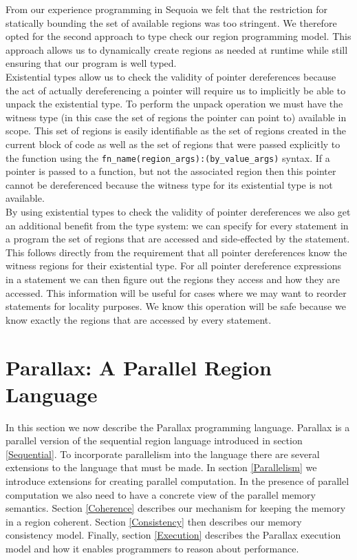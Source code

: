 \documentclass{article}
\theoremstyle{definition}
\begin{document}
\noindent
From our experience programming in Sequoia we felt that the restriction for statically
bounding the set of available regions was too stringent.  We therefore opted for the
second approach to type check our region programming model.  This approach
allows us to dynamically create regions as needed at runtime while still ensuring
that our program is well typed. \\

\noindent
Existential types allow us to check the validity of pointer dereferences because
the act of actually dereferencing a pointer will require us to implicitly be able
to unpack the existential type.  To perform the unpack operation we must have
the witness type (in this case the set of regions the pointer can point to) available
in scope.  This set of regions is easily identifiable as the set of regions created
in the current block of code as well as the set of regions that were passed explicitly
to the function using the {\tt fn\_name(region\_args):(by\_value\_args)} syntax.  If
a pointer is passed to a function, but not the associated region then this pointer
cannot be dereferenced because the witness type for its existential type is not
available.  \\

\noindent
By using existential types to check the validity of pointer dereferences we also get
an additional benefit from the type system: we can specify for every statement in a
program the set of regions that are accessed and side-effected by the statement.  This
follows directly from the requirement that all pointer dereferences know the witness
regions for their existential type.  For all pointer dereference expressions in a
statement we can then figure out the regions they access and how they are accessed.
This information will be useful for cases where we may want to reorder statements for
locality purposes.  We know this operation will be safe because we know exactly the
regions that are accessed by every statement.

\pagebreak


\section{Parallax: A Parallel Region Language \label{Parallax}}
\noindent
In this section we now describe the Parallax programming language.
Parallax is a parallel version of the sequential region language introduced
in section \ref{Sequential}.  To incorporate parallelism into the language
there are several extensions to the language that must be made.  In section
\ref{Parallelism} we introduce extensions for creating parallel computation.  In
the presence of parallel computation we also need to have a concrete view
of the parallel memory semantics.  Section \ref{Coherence} describes our
mechanism for keeping the memory in a region coherent.  Section \ref{Consistency}
then describes our memory consistency model.  Finally, section \ref{Execution}
describes the Parallax execution model and how it enables programmers to
reason about performance.
\end{document}
